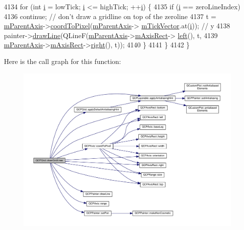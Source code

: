 \begin{DoxyCode}
4134     \textcolor{keywordflow}{for} (\textcolor{keywordtype}{int} \hyperlink{_comparision_pictures_2_createtest_image_8m_a6f6ccfcf58b31cb6412107d9d5281426}{i} = lowTick; \hyperlink{_comparision_pictures_2_createtest_image_8m_a6f6ccfcf58b31cb6412107d9d5281426}{i} <= highTick; ++\hyperlink{_comparision_pictures_2_createtest_image_8m_a6f6ccfcf58b31cb6412107d9d5281426}{i}) \{
4135       \textcolor{keywordflow}{if} (\hyperlink{_comparision_pictures_2_createtest_image_8m_a6f6ccfcf58b31cb6412107d9d5281426}{i} == zeroLineIndex)
4136         \textcolor{keywordflow}{continue}; \textcolor{comment}{// don't draw a gridline on top of the zeroline}
4137       t = \hyperlink{class_q_c_p_grid_a9a8a76731e6e737b65b929fd1995cc88}{mParentAxis}->\hyperlink{class_q_c_p_axis_a985ae693b842fb0422b4390fe36d299a}{coordToPixel}(\hyperlink{class_q_c_p_grid_a9a8a76731e6e737b65b929fd1995cc88}{mParentAxis}->
      \hyperlink{class_q_c_p_axis_aae0f9b9973b85be601200f00f5825087}{mTickVector}.at(\hyperlink{_comparision_pictures_2_createtest_image_8m_a6f6ccfcf58b31cb6412107d9d5281426}{i})); \textcolor{comment}{// y}
4138       painter->\hyperlink{class_q_c_p_painter_a0b4b1b9bd495e182c731774dc800e6e0}{drawLine}(QLineF(\hyperlink{class_q_c_p_grid_a9a8a76731e6e737b65b929fd1995cc88}{mParentAxis}->\hyperlink{class_q_c_p_axis_a6f150b65a202f32936997960e331dfcb}{mAxisRect}->
      \hyperlink{class_q_c_p_axis_rect_a55b3ecf72a3a65b053f7651b88db458d}{left}(), t,
4139                                \hyperlink{class_q_c_p_grid_a9a8a76731e6e737b65b929fd1995cc88}{mParentAxis}->\hyperlink{class_q_c_p_axis_a6f150b65a202f32936997960e331dfcb}{mAxisRect}->\hyperlink{class_q_c_p_axis_rect_a6d0f989fc552aa2b563cf82f8fc81e61}{right}(), t));
4140     \}
4141   \}
4142 \}
\end{DoxyCode}


Here is the call graph for this function\+:\nopagebreak
\begin{figure}[H]
\begin{center}
\leavevmode
\includegraphics[width=350pt]{class_q_c_p_grid_a3aff10e993f6625e255c19e4f97a09d8_cgraph}
\end{center}
\end{figure}




